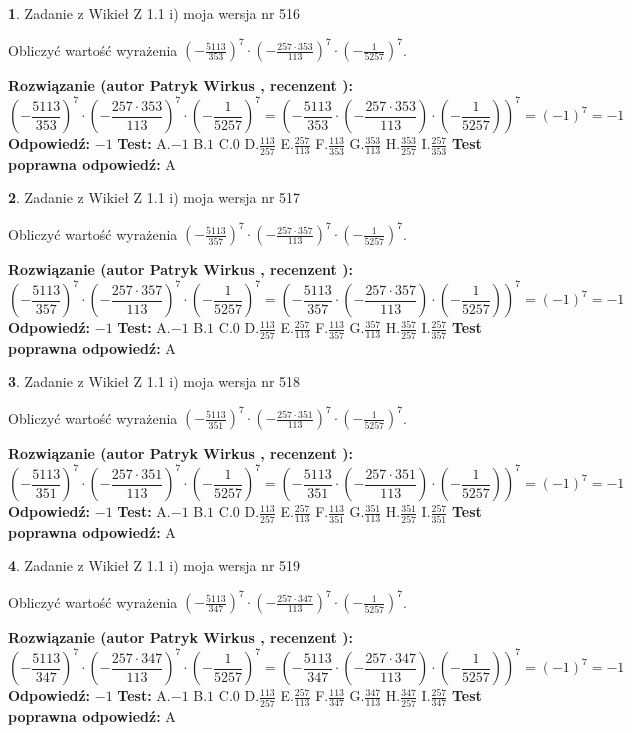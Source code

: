 \documentclass[12pt, a4paper]{article}
\theoremstyle{definition} %
\newtheorem{zad}{}
\newcommand{\zadStart}[1]{\begin{zad}#1\newline}
\newcommand{\zadStop}{\end{zad}}
\newcommand{\rozwStart}[2]{\noindent \textbf{Rozwiązanie (autor #1 , recenzent #2): }\newline}
\newcommand{\rozwStop}{\newline}
\newcommand{\odpStart}{\noindent \textbf{Odpowiedź:}\newline}
\newcommand{\odpStop}{\newline}
\newcommand{\testStart}{\noindent \textbf{Test:}\newline}
\newcommand{\testStop}{\newline}
\newcommand{\kluczStart}{\noindent \textbf{Test poprawna odpowiedź:}\newline}
\newcommand{\kluczStop}{\newline}
\begin{document}
\zadStart{Zadanie z Wikieł Z 1.1 i) moja wersja nr 516}

Obliczyć wartość wyrażenia $(-\frac{5113}{353})^{7} \cdot (-\frac{257 \cdot 353}{113})^{7} \cdot (-\frac{1}{5257})^{7}$.
\zadStop
\rozwStart{Patryk Wirkus}{}
$$(-\frac{5113}{353})^{7} \cdot (-\frac{257 \cdot 353}{113})^{7} \cdot (-\frac{1}{5257})^{7} = (-\frac{5113}{353} \cdot (-\frac{257 \cdot 353}{113}) \cdot (-\frac{1}{5257}))^{7} = (-1)^{7} = -1$$
\rozwStop
\odpStart
$-1$
\odpStop
\testStart
A.$-1$ B.$1$ C.$0$ D.$\frac{113}{257}$ E.$\frac{257}{113}$
F.$\frac{113}{353}$ G.$\frac{353}{113}$
H.$\frac{353}{257}$
I.$\frac{257}{353}$
\testStop
\kluczStart
A
\kluczStop



\zadStart{Zadanie z Wikieł Z 1.1 i) moja wersja nr 517}

Obliczyć wartość wyrażenia $(-\frac{5113}{357})^{7} \cdot (-\frac{257 \cdot 357}{113})^{7} \cdot (-\frac{1}{5257})^{7}$.
\zadStop
\rozwStart{Patryk Wirkus}{}
$$(-\frac{5113}{357})^{7} \cdot (-\frac{257 \cdot 357}{113})^{7} \cdot (-\frac{1}{5257})^{7} = (-\frac{5113}{357} \cdot (-\frac{257 \cdot 357}{113}) \cdot (-\frac{1}{5257}))^{7} = (-1)^{7} = -1$$
\rozwStop
\odpStart
$-1$
\odpStop
\testStart
A.$-1$ B.$1$ C.$0$ D.$\frac{113}{257}$ E.$\frac{257}{113}$
F.$\frac{113}{357}$ G.$\frac{357}{113}$
H.$\frac{357}{257}$
I.$\frac{257}{357}$
\testStop
\kluczStart
A
\kluczStop



\zadStart{Zadanie z Wikieł Z 1.1 i) moja wersja nr 518}

Obliczyć wartość wyrażenia $(-\frac{5113}{351})^{7} \cdot (-\frac{257 \cdot 351}{113})^{7} \cdot (-\frac{1}{5257})^{7}$.
\zadStop
\rozwStart{Patryk Wirkus}{}
$$(-\frac{5113}{351})^{7} \cdot (-\frac{257 \cdot 351}{113})^{7} \cdot (-\frac{1}{5257})^{7} = (-\frac{5113}{351} \cdot (-\frac{257 \cdot 351}{113}) \cdot (-\frac{1}{5257}))^{7} = (-1)^{7} = -1$$
\rozwStop
\odpStart
$-1$
\odpStop
\testStart
A.$-1$ B.$1$ C.$0$ D.$\frac{113}{257}$ E.$\frac{257}{113}$
F.$\frac{113}{351}$ G.$\frac{351}{113}$
H.$\frac{351}{257}$
I.$\frac{257}{351}$
\testStop
\kluczStart
A
\kluczStop



\zadStart{Zadanie z Wikieł Z 1.1 i) moja wersja nr 519}

Obliczyć wartość wyrażenia $(-\frac{5113}{347})^{7} \cdot (-\frac{257 \cdot 347}{113})^{7} \cdot (-\frac{1}{5257})^{7}$.
\zadStop
\rozwStart{Patryk Wirkus}{}
$$(-\frac{5113}{347})^{7} \cdot (-\frac{257 \cdot 347}{113})^{7} \cdot (-\frac{1}{5257})^{7} = (-\frac{5113}{347} \cdot (-\frac{257 \cdot 347}{113}) \cdot (-\frac{1}{5257}))^{7} = (-1)^{7} = -1$$
\rozwStop
\odpStart
$-1$
\odpStop
\testStart
A.$-1$ B.$1$ C.$0$ D.$\frac{113}{257}$ E.$\frac{257}{113}$
F.$\frac{113}{347}$ G.$\frac{347}{113}$
H.$\frac{347}{257}$
I.$\frac{257}{347}$
\testStop
\kluczStart
A
\kluczStop
\end{document}
